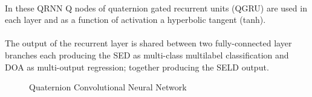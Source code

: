 \documentclass{article}
\begin{document}
    \\ In these QRNN Q nodes of quaternion gated recurrent units (QGRU) are used in each layer and as a function of activation
    a hyperbolic tangent (tanh).
    \\ \\ The output of the recurrent layer is shared between two fully-connected layer branches each producing the SED as 
    multi-class multilabel classification and DOA as multi-output regression; together producing the SELD output.
    \begin{figure}[htb!]
        \centering
        \caption{Quaternion Convolutional Neural Network}
        \label{fig:dqnn}
    \end{figure}
\end{document}
